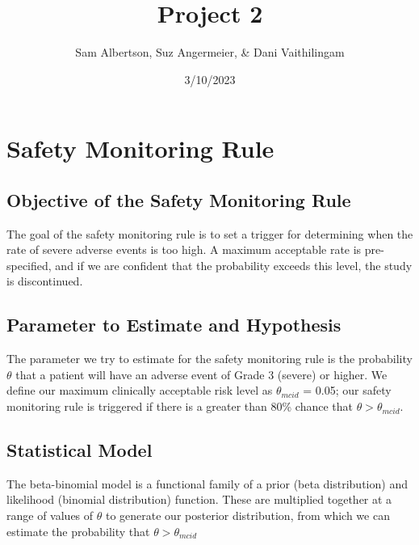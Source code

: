 \documentclass[
]{article}
\title{Project 2}
\author{Sam Albertson, Suz Angermeier, \& Dani Vaithilingam}
\date{3/10/2023}
\begin{document}
\maketitle

{
\setcounter{tocdepth}{3}
\tableofcontents
}
\hypertarget{safety-monitoring-rule}{%
\section{Safety Monitoring Rule}\label{safety-monitoring-rule}}

\hypertarget{objective-of-the-safety-monitoring-rule}{%
\subsection{Objective of the Safety Monitoring
Rule}\label{objective-of-the-safety-monitoring-rule}}

The goal of the safety monitoring rule is to set a trigger for
determining when the rate of severe adverse events is too high. A
maximum acceptable rate is pre-specified, and if we are confident that
the probability exceeds this level, the study is discontinued.

\hypertarget{parameter-to-estimate-and-hypothesis}{%
\subsection{Parameter to Estimate and
Hypothesis}\label{parameter-to-estimate-and-hypothesis}}

The parameter we try to estimate for the safety monitoring rule is the
probability \(\theta\) that a patient will have an adverse event of
Grade 3 (severe) or higher. We define our maximum clinically acceptable
risk level as \(\theta_{mcid}\) = 0.05; our safety monitoring rule is
triggered if there is a greater than 80\% chance that
\(\theta > \theta_{mcid}\).

\hypertarget{statistical-model}{%
\subsection{Statistical Model}\label{statistical-model}}

The beta-binomial model is a functional family of a prior (beta
distribution) and likelihood (binomial distribution) function. These are
multiplied together at a range of values of \(\theta\) to generate our
posterior distribution, from which we can estimate the probability that
\(\theta > \theta_{mcid}\)
\end{document}
